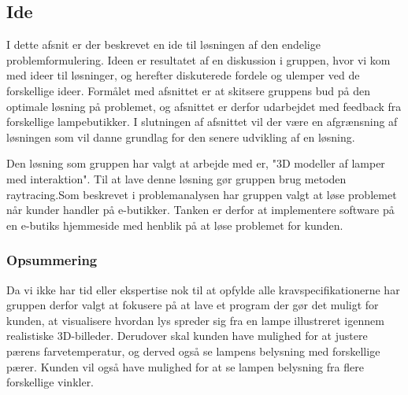 \subsection{Ide}
I dette afsnit er der beskrevet en ide til løsningen af den endelige problemformulering. Ideen er resultatet af en diskussion i gruppen, hvor vi kom med ideer til løsninger, og herefter diskuterede fordele og ulemper ved de forskellige ideer. Formålet med afsnittet er at skitsere gruppens bud på den optimale løsning på problemet, og afsnittet er derfor udarbejdet med feedback fra forskellige lampebutikker. I slutningen af afsnittet vil der være en afgrænsning af løsningen som vil danne grundlag for den senere udvikling af en løsning.

Den løsning som gruppen har valgt at arbejde med er, "3D modeller af lamper med interaktion". Til at lave denne løsning gør gruppen brug metoden raytracing.\newline Som beskrevet i problemanalysen har gruppen valgt at løse problemet når kunder handler på e-butikker. Tanken er derfor at implementere software på en e-butiks hjemmeside med henblik på at løse problemet for kunden.





\subsubsection*{Opsummering}

Da vi ikke har tid eller ekspertise nok til at opfylde alle kravspecifikationerne har gruppen derfor valgt at fokusere på at lave et program der gør det muligt for kunden, at visualisere hvordan lys spreder sig fra en lampe illustreret igennem realistiske 3D-billeder. Derudover skal kunden have mulighed for at justere pærens farvetemperatur, og derved også se lampens belysning med forskellige pærer. Kunden vil også have mulighed for at se lampen belysning fra flere forskellige vinkler. 